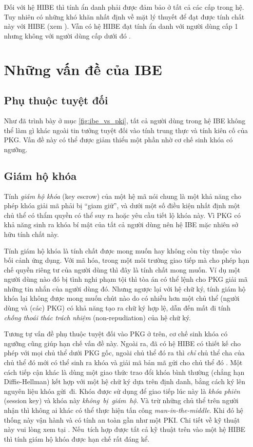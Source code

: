 \documentclass[class=report, crop=false]{standalone}
\begin{document}
			Đối với hệ HIBE thì tính ẩn danh phải được đảm bảo ở tất cả các cấp trong hệ. Tuy nhiên có những khó khăn nhất định về mặt lý thuyết để đạt được tính chất này với HIBE (xem \cite{DBLP:conf/crypto/BoyenW06}). Vẫn có hệ HIBE đạt tính ẩn danh với người dùng cấp 1 nhưng không với người dùng cấp dưới đó \cite{DBLP:conf/asiacrypt/GentryS02}.
	\section{Những vấn đề của IBE}
		\subsection{Phụ thuộc tuyệt đối}
			Như đã trình bày ở mục \ref{fig:ibe_vs_pki}, tất cả người dùng trong hệ IBE không thể làm gì khác ngoài tin tưởng tuyệt đối vào tính trung thực và tính kiên cố của PKG. Vấn đề này có thể được giảm thiểu một phần nhờ cơ chế sinh khóa có ngưỡng.
		\subsection{Giám hộ khóa}\label{subsec:key_escrow}
			Tính \textit{giám hộ khóa} (key escrow) của một hệ mã nói chung là một khả năng cho phép khóa giải mã phải bị ``giam giữ'', và dưới một số điều kiện nhất định một chủ thể có thẩm quyền có thể suy ra hoặc yêu cầu tiết lộ khóa này. Vì PKG có khả năng sinh ra khóa bí mật của tất cả người dùng nên hệ IBE mặc nhiên sở hữu tính chất này.

			Tính giám hộ khóa là tính chất được mong muốn hay không còn tùy thuộc vào bối cảnh ứng dụng. Với mã hóa, trong một môi trường giao tiếp mà cho phép hạn chế quyền riêng tư của người dùng thì đây là tính chất mong muốn. Ví dụ một người dùng nào đó bị tình nghi phạm tội thì tòa án có thể lệnh cho PKG giải mã những tin nhắn của người dùng đó. Nhưng ngược lại với hệ chữ ký, tính giám hộ khóa lại không được mong muốn chút nào do có nhiều hơn một chủ thể (người dùng và (các) PKG) có khả năng tạo ra chữ ký hợp lệ, dẫn đến mất đi tính \textit{chống thoái thác trách nhiệm} (non-repudiation) của hệ chữ ký.

			Tương tự vấn đề phụ thuộc tuyệt đối vào PKG ở trên, cơ chế sinh khóa có ngưỡng cũng giúp hạn chế vấn đề này. Ngoài ra, đã có hệ HIBE có thiết kế cho phép với mọi chủ thể dưới PKG gốc, ngoài chủ thể đó ra thì \emph{chỉ} chủ thể cha của chủ thể đó mới có thể sinh ra khóa và giải mã bản mã gửi cho chủ thể đó \cite[mục 6.1]{DBLP:conf/asiacrypt/GentryS02}. Một cách tiếp cận khác là dùng một giao thức trao đổi khóa bình thường (chẳng hạn Diffie-Hellman) kết hợp với một hệ chữ ký dựa trên định danh, bằng cách ký lên nguyên liệu khóa gửi~đi. Khóa được sử dụng để giao tiếp lúc này là \textit{khóa phiên} (session key) và khóa này \emph{không~bị~giám~hộ}. Và trừ những chủ thể trên người nhận thì không ai khác có thể thực hiện tấn công \textit{man-in-the-middle}. Khi đó hệ thống này vận hành và có tính an toàn gần như một PKI. Chi tiết về kỹ thuật này vui lòng xem tại \cite[mục 6.2]{DBLP:conf/asiacrypt/GentryS02}. Nếu~tích hợp được tất cả kỹ thuật trên vào một hệ HIBE thì tính giám hộ khóa được hạn chế rất đáng kể.
\end{document}
